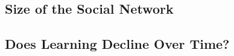 \subsection{Size of the Social Network}
\label{sub:size_of_the_social_network}

\subsection{Does Learning Decline Over Time?}
\label{sub:does_learning_decline_over_time_}



